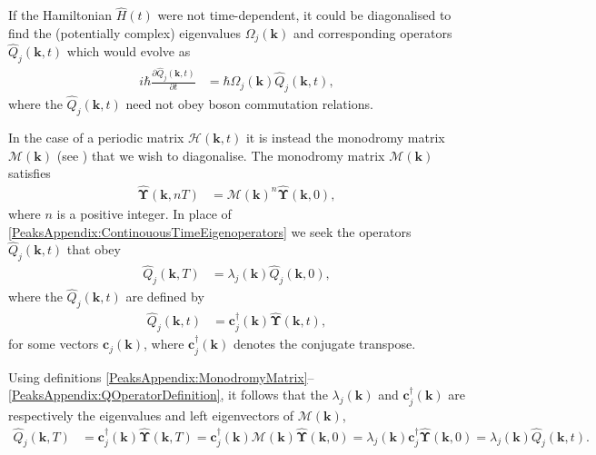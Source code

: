 If the Hamiltonian $\hat{H}(t)$ were not time-dependent, it could be diagonalised to find the (potentially complex) eigenvalues $\Omega_j(\bm{k})$ and corresponding operators $\hat{Q}_j(\bm{k}, t)$ which would evolve as
\begin{align}
    \label{PeaksAppendix:ContinouousTimeEigenoperators}
    i \hbar \frac{\partial \hat{Q}_j(\bm{k}, t)}{\partial t} &= \hbar \Omega_j(\bm{k}) \hat{Q}_j(\bm{k}, t),
\end{align}
where the $\hat{Q}_j(\bm{k}, t)$ need not obey boson commutation relations.

In the case of a periodic matrix $\mathcal{H}(\bm{k}, t)$ it is instead the monodromy matrix $\mathcal{M}(\bm{k})$ (see ) that we wish to diagonalise. The monodromy matrix $\mathcal{M}(\bm{k})$ satisfies
\begin{align}
    \label{PeaksAppendix:MonodromyMatrix}
    \hat{\bm{\Upsilon}}(\bm{k}, nT) &= \mathcal{M}(\bm{k})^n \hat{\bm{\Upsilon}}(\bm{k}, 0),
\end{align}
where $n$ is a positive integer. In place of \eqref{PeaksAppendix:ContinouousTimeEigenoperators} we seek the operators $\hat{Q}_j(\bm{k}, t)$ that obey
\begin{align}
    \label{PeaksAppendix:QOperatorEvolution}
    \hat{Q}_j(\bm{k}, T) &= \lambda_j(\bm{k}) \hat{Q}_j(\bm{k}, 0),
\end{align}
where the $\hat{Q}_j(\bm{k}, t)$ are defined by
\begin{align}
    \label{PeaksAppendix:QOperatorDefinition}
    \hat{Q}_j(\bm{k}, t) &= \bm{c}_j^\dagger(\bm{k}) \hat{\bm{\Upsilon}}(\bm{k}, t),
\end{align}
for some vectors $\bm{c}_j(\bm{k})$, where $\bm{c}_j^\dagger(\bm{k})$ denotes the conjugate transpose. 

Using definitions \eqref{PeaksAppendix:MonodromyMatrix}--\eqref{PeaksAppendix:QOperatorDefinition}, it follows that the $\lambda_j(\bm{k})$ and $\bm{c}_j^\dagger(\bm{k})$ are respectively the eigenvalues and left eigenvectors of $\mathcal{M}(\bm{k})$,
\begin{align}
    \hat{Q}_j(\bm{k}, T) &= \bm{c}_j^\dagger(\bm{k}) \hat{\bm{\Upsilon}}(\bm{k}, T) = \bm{c}_j^\dagger(\bm{k}) \mathcal{M}(\bm{k}) \hat{\bm{\Upsilon}}(\bm{k}, 0) = \lambda_j(\bm{k}) \bm{c}_j^\dagger \hat{\bm{\Upsilon}}(\bm{k}, 0) = \lambda_j(\bm{k}) \hat{Q}_j(\bm{k}, t).
\end{align}

